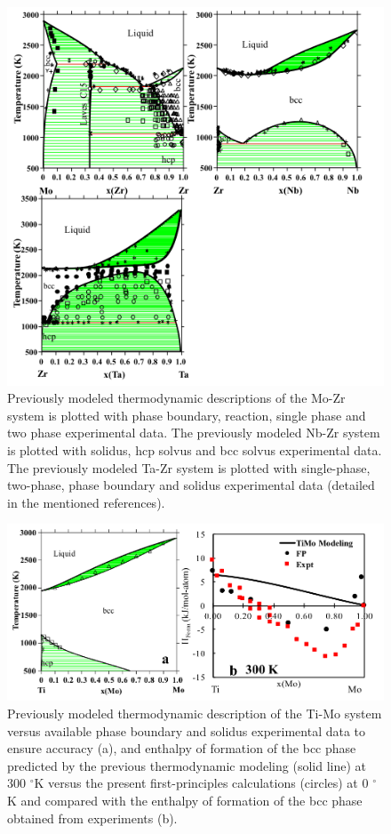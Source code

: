\newpage
\begin{figure}[H]
	\centering
	\includegraphics[width=\textwidth]{Chapter-3/Figures/binary2.png}
	\caption{Previously modeled thermodynamic descriptions of the Mo-Zr \cite{Perez2003} system is plotted with phase boundary, reaction, single phase and two phase experimental data. The previously modeled Nb-Zr \cite{Guillermet1991,Abriata1982} system is plotted with solidus, hcp solvus and bcc solvus experimental data. The previously modeled Ta-Zr \cite{Guillermet1995} system is plotted with single-phase, two-phase, phase boundary and solidus experimental data (detailed in the mentioned references).}
	\label{Ch3-figure:binary2}
\end{figure}

\newpage
\begin{figure}[H]
	\centering
	\includegraphics[width=\textwidth]{Chapter-3/Figures/TiMo.png}
	\caption{Previously modeled thermodynamic description of the Ti-Mo system versus available phase boundary and solidus experimental data to ensure accuracy \cite{Ansara1998,Murray1981} (a), and enthalpy of formation of the bcc phase predicted by the previous thermodynamic modeling (solid line) at 300 $^{\circ}$K versus the present first-principles calculations (circles) at 0 $^{\circ}$K and compared with the enthalpy of formation of the bcc phase obtained from experiments \cite{Uesugi2013} (b).}
	\label{Ch3-figure:TiMo}
\end{figure}

